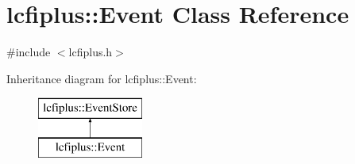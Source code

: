 \section{lcfiplus\+:\+:Event Class Reference}
\label{classlcfiplus_1_1Event}


{\ttfamily \#include $<$lcfiplus.\+h$>$}

Inheritance diagram for lcfiplus\+:\+:Event\+:\begin{figure}[H]
\begin{center}
\leavevmode
\includegraphics[height=2.000000cm]{classlcfiplus_1_1Event}
\end{center}
\end{figure}
